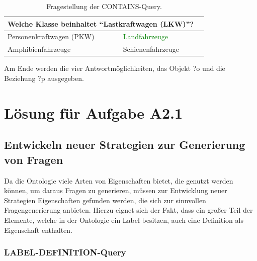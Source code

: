 \documentclass[headsepline,titlepage,ngerman,twoside,12pt]{report}
\begin{document}
\begin{table}
\begin{centering}
\begin{tabularx}{\textwidth}{XXX}
\toprule
\multicolumn{2}{p{0.97\textwidth}}{Welche Klasse beinhaltet \enquote{Lastkraftwagen (LKW)}?}\\
\midrule
Personenkraftwagen (PKW)	&\textcolor{green}{Landfahrzeuge}\\
Amphibienfahrzeuge			&Schienenfahrzeuge\\
\bottomrule
\end{tabularx}
\end{centering}
\caption{Fragestellung der CONTAINS-Query.}
\label{tab:sparqcontainsexample}
\end{table}



Am Ende werden die vier Antwortmöglichkeiten, das Objekt ?o und die Beziehung ?p ausgegeben.

\section{Lösung für Aufgabe A2.1}
\subsection{Entwickeln neuer Strategien zur Generierung von Fragen}

Da die Ontologie viele Arten von Eigenschaften bietet, die genutzt werden können, um daraus Fragen zu generieren, müssen zur Entwicklung neuer Strategien Eigenschaften gefunden werden, die sich zur sinnvollen Fragengenerierung anbieten.
Hierzu eignet sich der Fakt, dass ein großer Teil der Elemente, welche in der Ontologie ein Label besitzen, auch eine Definition als Eigenschaft enthalten.

\subsubsection{LABEL-DEFINITION-Query}
\label{sub:labeldefinition}
\end{document}
